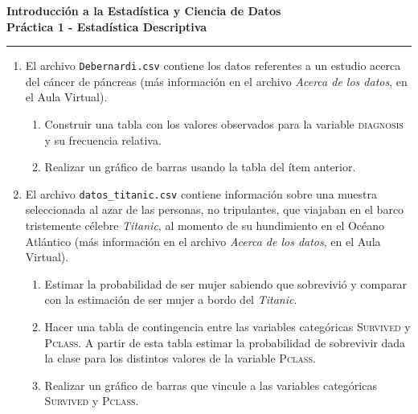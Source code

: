 \documentclass[12pt]{article}%
\begin{document}
	\noindent
	\textbf{Introducci\'on a la Estad\'istica y Ciencia de Datos}\\[0.2cm]\textbf{Pr\'actica 1 - Estad\'istica Descriptiva}
	\vspace{-0.3cm}
	\newline
	\rule{18cm}{0.2mm}


\begin{enumerate}


\item \label{pancreas} El archivo \texttt{Debernardi.csv} contiene los datos referentes a un estudio acerca del c\'ancer de p\'ancreas (m\'as informaci\'on en el archivo \textit{Acerca de los datos}, en el Aula Virtual). 
		\begin{enumerate}
			\item Construir una tabla con los valores observados para la variable \textsc{diagnosis} y su frecuencia relativa.
			\item Realizar un gr\'afico de barras usando la tabla del \'item anterior.
			\end{enumerate}

\item El archivo \texttt{datos\_titanic.csv} contiene informaci\'on sobre una muestra seleccionada al azar de las personas, no tripulantes, que viajaban en el barco tristemente c\'elebre \emph{Titanic}, al momento de su hundimiento en el Oc\'eano Atl\'antico (m\'as informaci\'on en el archivo \textit{Acerca de los datos}, en el Aula Virtual). %
\begin{enumerate}
\item Estimar la probabilidad de ser mujer sabiendo que sobrevivi\'o y comparar con la estimaci\'on de ser mujer a bordo del \emph{Titanic}.
\item Hacer una tabla de contingencia entre las variables categ\'oricas \textsc{Survived} y \textsc{Pclass}. A partir de esta tabla estimar la probabilidad de sobrevivir dada la clase para los distintos valores de la variable \textsc{Pclass}.
\item Realizar un gr\'afico de barras que vincule a las variables categ\'oricas \textsc{Survived} y \textsc{Pclass}.
\end{enumerate}


\end{enumerate}
\end{document}
